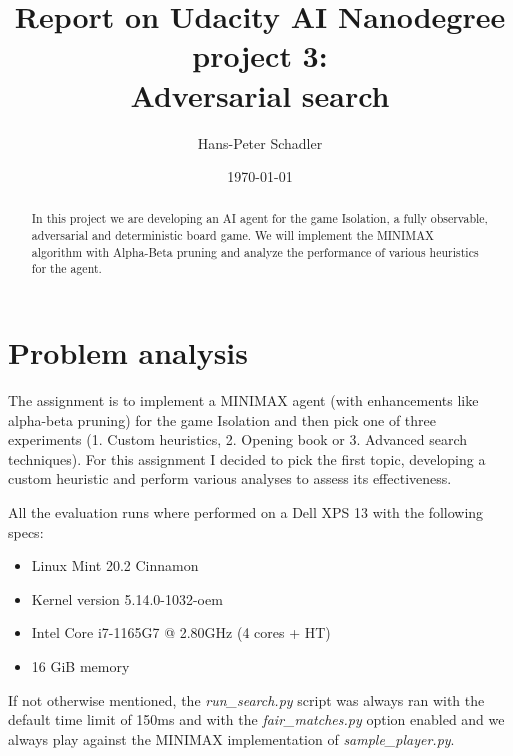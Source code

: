 \documentclass[aps,prd,notitlepage,floatfix,superscriptaddress,groupedaddress,nofootinbib]{revtex4-1}
\begin{document}
\title{Report on Udacity AI Nanodegree project 3:\\Adversarial search}

\author{Hans-Peter Schadler}

\date{\today}


\begin{abstract}
    In this project we are developing an AI agent for the game Isolation, a fully observable, adversarial and deterministic board game. We will implement the MINIMAX algorithm with Alpha-Beta pruning and analyze the performance of various heuristics for the agent.
\end{abstract}

\maketitle




\section{Problem analysis}

The assignment is to implement a MINIMAX agent (with enhancements like alpha-beta pruning) for the game Isolation and then pick one of three experiments (1. Custom heuristics, 2. Opening book or 3. Advanced search techniques). For this assignment I decided to pick the first topic, developing a custom heuristic and perform various analyses to assess its effectiveness.

All the evaluation runs where performed on a Dell XPS 13 with the following specs:
\begin{itemize}[nosep]
    \item Linux Mint 20.2 Cinnamon
    \item Kernel version 5.14.0-1032-oem
    \item Intel Core i7-1165G7 @ 2.80GHz (4 cores + HT)
    \item 16 GiB memory
\end{itemize}
If not otherwise mentioned, the \textit{run\_search.py} script was always ran with the default time limit of 150ms and with the \textit{fair\_matches.py} option enabled and we always play against the MINIMAX implementation of \textit{sample\_player.py}.
\end{document}
